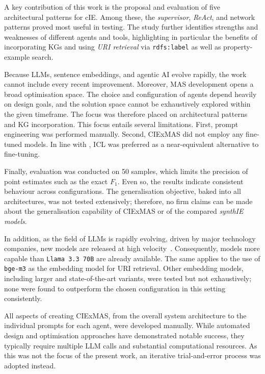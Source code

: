 \documentclass[a4paper,oneside,bibliography=totoc]{scrbook}
\begin{document}
A key contribution of this work is the proposal and evaluation of five architectural patterns for \ac{cIE}. Among these, the \textit{supervisor}, \textit{\ac{ReAct}}, and network patterns proved most useful in testing. The study further identifies strengths and weaknesses of different agents and tools, highlighting in particular the benefits of incorporating \acp{KG} and using \textit{\ac{URI} retrieval} via \texttt{rdfs:label} as well as property-example search.

Because \acp{LLM}, sentence embeddings, and agentic AI evolve rapidly, the work cannot include every recent improvement. Moreover, \ac{MAS} development opens a broad optimisation space. The choice and configuration of agents depend heavily on design goals, and the solution space cannot be exhaustively explored within the given timeframe. The focus was therefore placed on architectural patterns and \ac{KG} incorporation. This focus entails several limitations. First, prompt engineering was performed manually. Second, CIExMAS did not employ any fine-tuned models. In line with \citet{Brown2020}, \ac{ICL} was preferred as a near-equivalent alternative to fine-tuning.

Finally, evaluation was conducted on 50 samples, which limits the precision of point estimates such as the exact $F_{1}$. Even so, the results indicate consistent behaviour across configurations. The generalisation objective, baked into all architectures, was not tested extensively; therefore, no firm claims can be made about the generalisation capability of CIExMAS or of the compared \textit{synthIE models}.

In addition, as the field of \acp{LLM} is rapidly evolving, driven by major technology companies, new models are released at high velocity~\cite{Brown2020,Grattafiori2024,MetaAI2025,Chiang2024}. Consequently, models more capable than \texttt{Llama 3.3 70B} are already available. The same applies to the use of \texttt{bge-m3} as the embedding model for \ac{URI} retrieval. Other embedding models, including larger and state-of-the-art variants, were tested but not exhaustively; none were found to outperform the chosen configuration in this setting consistently.

All aspects of creating CIExMAS, from the overall system architecture to the individual prompts for each agent, were developed manually. While automated design and optimisation approaches have demonstrated notable success, they typically require multiple \ac{LLM} calls and substantial computational resources. As this was not the focus of the present work, an iterative trial-and-error process was adopted instead.
\end{document}
